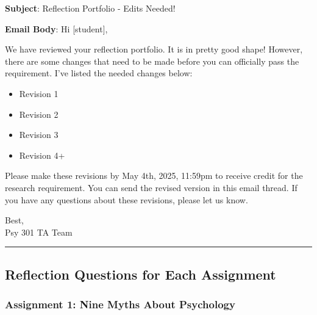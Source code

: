 \documentclass[
]{article}
\providecommand{\tightlist}{%
  \setlength{\itemsep}{0pt}\setlength{\parskip}{0pt}}
\begin{document}
\textbf{Subject}: Reflection Portfolio - Edits Needed!

\textbf{Email Body}:
Hi {[}student{]},

We have reviewed your reflection portfolio. It is in pretty good shape! However, there are some changes that need to be made before you can officially pass the requirement. I've listed the needed changes below:

\begin{itemize}
\tightlist
\item
  Revision 1\\
\item
  Revision 2\\
\item
  Revision 3\\
\item
  Revision 4+
\end{itemize}

Please make these revisions by May 4th, 2025, 11:59pm to receive credit for the research requirement. You can send the revised version in this email thread. If you have any questions about these revisions, please let us know.

Best,\\
Psy 301 TA Team

\begin{center}\rule{0.5\linewidth}{0.5pt}\end{center}

\hypertarget{reflection-questions-for-each-assignment}{%
\subsection{Reflection Questions for Each Assignment}\label{reflection-questions-for-each-assignment}}

\hypertarget{assignment-1-nine-myths-about-psychology}{%
\subsubsection{Assignment 1: Nine Myths About Psychology}\label{assignment-1-nine-myths-about-psychology}}
\end{document}
